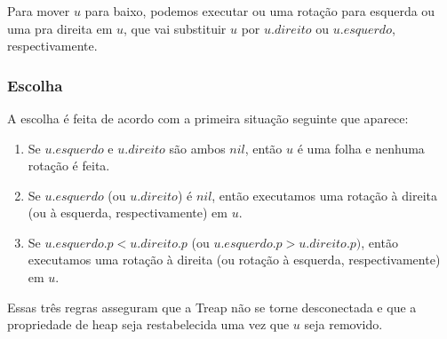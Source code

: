 \documentclass{beamer}
\begin{document}
\begin{frame}
\frametitle{}
Para mover \ensuremath{\ensuremath{\ensuremath{\mathit{u}}}} para baixo, podemos
executar ou uma rotação para esquerda ou uma pra direita em \ensuremath{\ensuremath{\ensuremath{\mathit{u}}}}, que vai substituir \ensuremath{\ensuremath{\ensuremath{\mathit{u}}}}
por \ensuremath{\ensuremath{\ensuremath{\mathit{u}}.\ensuremath{\mathit{direito}}}} ou \ensuremath{\ensuremath{\ensuremath{\mathit{u}}.\ensuremath{\mathit{esquerdo}}}}, respectivamente.
\end{frame}
\begin{frame}
\frametitle{Escolha}
A escolha é feita de acordo com a primeira situação seguinte que aparece:
\begin{enumerate}
\item Se \ensuremath{\ensuremath{\ensuremath{\mathit{u}}.\ensuremath{\mathit{esquerdo}}}} e \ensuremath{\ensuremath{\ensuremath{\mathit{u}}.\ensuremath{\mathit{direito}}}} são ambos \ensuremath{\ensuremath{\ensuremath{\mathit{nil}}}}, então \ensuremath{\ensuremath{\ensuremath{\mathit{u}}}} é uma folha e nenhuma rotação é feita.
\item Se \ensuremath{\ensuremath{\ensuremath{\mathit{u}}.\ensuremath{\mathit{esquerdo}}}} (ou \ensuremath{\ensuremath{\ensuremath{\mathit{u}}.\ensuremath{\mathit{direito}}}}) é \ensuremath{\ensuremath{\ensuremath{\mathit{nil}}}}, então executamos uma rotação à direita (ou à esquerda, respectivamente) em \ensuremath{\ensuremath{\ensuremath{\mathit{u}}}}.
\item Se $\ensuremath{\ensuremath{\ensuremath{\mathit{u}}.\ensuremath{\mathit{esquerdo}}.\ensuremath{\mathit{p}}}} < \ensuremath{\ensuremath{\ensuremath{\mathit{u}}.\ensuremath{\mathit{direito}}.\ensuremath{\mathit{p}}}}$ (ou $\ensuremath{\ensuremath{\ensuremath{\mathit{u}}.\ensuremath{\mathit{esquerdo}}.\ensuremath{\mathit{p}}}} > \ensuremath{\ensuremath{\ensuremath{\mathit{u}}.\ensuremath{\mathit{direito}}.\ensuremath{\mathit{p}}}})$, então executamos uma rotação à direita (ou rotação à esquerda, respectivamente) em \ensuremath{\ensuremath{\ensuremath{\mathit{u}}}}.
\end{enumerate}
Essas três regras asseguram que a Treap não se torne desconectada e que a 
propriedade de heap seja restabelecida uma vez que \ensuremath{\ensuremath{\ensuremath{\mathit{u}}}} seja removido.
\end{frame}
\end{document}
